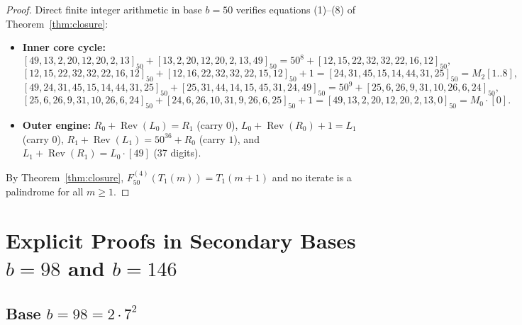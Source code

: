 \documentclass[11pt,a4paper]{article}
\theoremstyle{definition}
\theoremstyle{remark}
\begin{document}
\begin{proof}
Direct finite integer arithmetic in base $b = 50$ verifies equations (1)--(8) of Theorem~\ref{thm:closure}:
\begin{itemize}
  \item \textbf{Inner core cycle:}
  \[
    [49, 13, 2, 20, 12, 20, 2, 13]_{50} + [13, 2, 20, 12, 20, 2, 13, 49]_{50} = 50^8 + [12, 15, 22, 32, 32, 22, 16, 12]_{50},
  \]
  \[
    [12, 15, 22, 32, 32, 22, 16, 12]_{50} + [12, 16, 22, 32, 32, 22, 15, 12]_{50} + 1 = [24, 31, 45, 15, 14, 44, 31, 25]_{50} = M_2[1..8],
  \]
  \[
    [49, 24, 31, 45, 15, 14, 44, 31, 25]_{50} + [25, 31, 44, 14, 15, 45, 31, 24, 49]_{50} = 50^9 + [25, 6, 26, 9, 31, 10, 26, 6, 24]_{50},
  \]
  \[
    [25, 6, 26, 9, 31, 10, 26, 6, 24]_{50} + [24, 6, 26, 10, 31, 9, 26, 6, 25]_{50} + 1 = [49, 13, 2, 20, 12, 20, 2, 13, 0]_{50} = M_0 \cdot [0].
  \]
  \item \textbf{Outer engine:} $R_0 + \operatorname{Rev}(L_0) = R_1$ (carry $0$), $L_0 + \operatorname{Rev}(R_0) + 1 = L_1$ (carry $0$), $R_1 + \operatorname{Rev}(L_1) = 50^{36} + R_0$ (carry $1$), and $L_1 + \operatorname{Rev}(R_1) = L_0 \cdot [49]$ (37 digits).
\end{itemize}
By Theorem~\ref{thm:closure}, $F_{50}^{(4)}(T_1(m)) = T_1(m+1)$ and no iterate is a palindrome for all $m \ge 1$.
\end{proof}

\section{Explicit Proofs in Secondary Bases $b = 98$ and $b = 146$}

\subsection{Base $b = 98 = 2 \cdot 7^2$}
\end{document}
